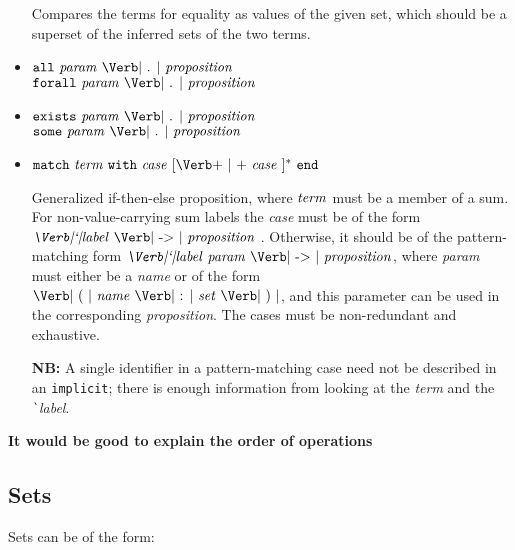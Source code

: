 \documentclass{article}
\newcommand{\keywd}[1]{\mbox{\texttt{#1}}\xspace}
\newcommand{\ALL}{\keywd{all}}
\newcommand{\END}{\keywd{end}}
\newcommand{\EXISTS}{\keywd{exists}}
\newcommand{\FORALL}{\keywd{forall}}
\newcommand{\IMPLICIT}{\keywd{implicit}}
\newcommand{\MATCH}{\keywd{match}}
\newcommand{\SOME}{\keywd{some}}
\newcommand{\WITH}{\keywd{with}}
\newcommand{\metav}[1]{\mbox{\textit{#1}}\xspace}
\newcommand{\Case}{\metav{case}}
\newcommand{\Ident}{\metav{name}}
\newcommand{\Identifier}{\Ident}
\newcommand{\Label}{\metav{\Verb|`|label}}
\newcommand{\Setexp}{\metav{set}}
\newcommand{\Proposition}{\metav{proposition}}
\newcommand{\Param}{\metav{param}}
\newcommand{\Term}{\metav{term}}
\newcommand{\ARROW}{\mbox{\Verb| -> |}}
\newcommand{\BAR}{\mbox{\Verb+ | +}}
\newcommand{\COLON}{\mbox{\Verb| : |}}
\newcommand{\LPAREN}{\mbox{\Verb| ( |}}
\newcommand{\RPAREN}{\mbox{\Verb| ) |}}
\newcommand{\PERIOD}{\mbox{\Verb| . |}}
\newcommand{\NB}{\textbf{NB: }}
\begin{document}
\begin{itemize}
   Compares the terms for equality as values of the given set, which
   should be a superset of the inferred sets of the two terms.

\item $\ALL\ \Param\ \PERIOD\ \Proposition$\\
      $\FORALL\ \Param\ \PERIOD\ \Proposition$
      

\item $\EXISTS\ \Param\ \PERIOD\ \Proposition$\\
      $\SOME\ \Param\ \PERIOD\ \Proposition$

\item $\MATCH\ \Term\ \WITH\ \Case\ [\BAR\ \Case\ ]^*\ \END$
  
  Generalized if-then-else proposition, where
  $\Term$ must be a member of a sum.  For non-value-carrying
  sum labels the \Case must be of the form  $\Label\ \ARROW\
  \Proposition$ .  Otherwise, it should be of the pattern-matching
  form $\Label\ \Param\ \ARROW\ \Proposition$, where \Param must
  either be a \Ident or of the form $\LPAREN\ \Identifier\ \COLON\ 
  \Setexp\ \RPAREN$, and this parameter can be used in the
  corresponding \Proposition.  The cases must be non-redundant
  and exhaustive.
  
  \NB A single identifier in a pattern-matching case need not
  be described in an \IMPLICIT; there is enough information from
  looking at the \Term and the \Label.
\end{itemize}

\textbf{It would be good to explain the order of operations}

\subsection{Sets}

Sets can be of the form:
\end{document}
